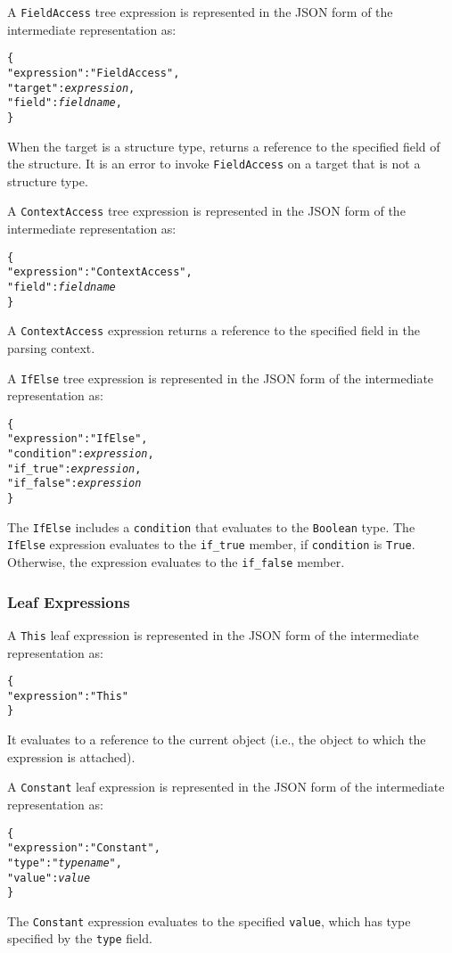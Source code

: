 \documentclass[10pt,twocolumn,a4paper]{article}
\newcommand{\code}[1]{\texttt{#1}}
\begin{document}
A \code{FieldAccess} tree expression is represented in the JSON form of the
intermediate representation as:
\footnotesize
\begin{alltt}
  \{
    "expression"  : "FieldAccess",
    "target"      : \emph{expression},
    "field"       : \emph{field name},
  \}
\end{alltt}
\normalsize
When the target is a structure type, returns a reference to the specified
field of the structure.
It is an error to invoke \code{FieldAccess} on a target that is not a
structure type.

A \code{ContextAccess} tree expression is represented in the JSON form
of the intermediate representation as:
\footnotesize
\begin{alltt}
  \{
    "expression"  : "ContextAccess",
    "field"       : \emph{field name}
  \}
\end{alltt}
\normalsize
A \code{ContextAccess} expression returns a reference to the specified
field in the parsing context.

A \code{IfElse} tree expression is represented in the JSON form of the
intermediate representation as:
\footnotesize
\begin{alltt}
  \{
    "expression"  : "IfElse",
    "condition"   : \emph{expression},
    "if\_true"     : \emph{expression},
    "if\_false"    : \emph{expression}
  \}
\end{alltt}
\normalsize
The \code{IfElse} includes a \code{condition} that evaluates to the \code{Boolean} type.
The \code{IfElse} expression evaluates to the \code{if\_true} member, if \code{condition}
is \code{True}. Otherwise, the expression evaluates to the \code{if\_false} member.

\subsubsection{Leaf Expressions}

A \code{This} leaf expression is represented in the JSON form of the
intermediate representation as:
\footnotesize
\begin{alltt}
  \{
    "expression"   : "This"
  \}
\end{alltt}
\normalsize
It evaluates to a reference to the current object (i.e., the object to
which the expression is attached).

A \code{Constant} leaf expression is represented in the JSON form of the
intermediate representation as:
\footnotesize
\begin{alltt}
  \{
    "expression"   : "Constant",
    "type"         : "\emph{type name}",
    "value"        : \emph{value}
  \}
\end{alltt}
\normalsize
The \code{Constant} expression evaluates to the specified \code{value},
which has type specified by the \code{type} field.
\end{document}
